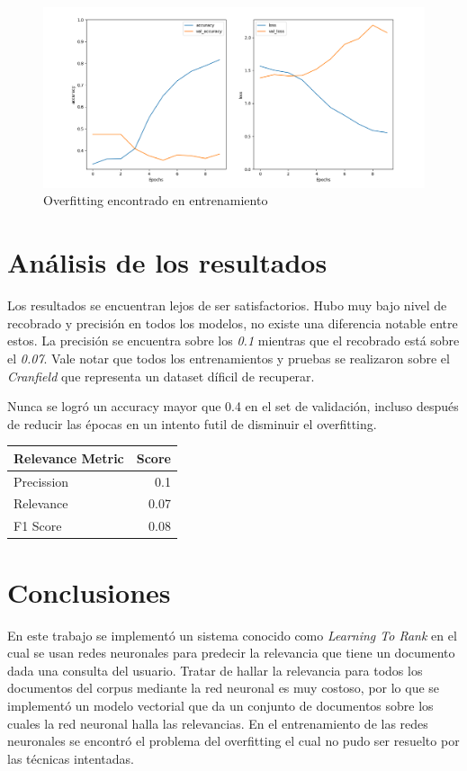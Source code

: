 \documentclass[12pt]{article}
\begin{document}
\begin{figure}
	\centering
	\includegraphics[width=0.7\linewidth]{img/overf}
	\caption{Overfitting encontrado en entrenamiento}
	\label{fig:overf}
\end{figure}


\section{Análisis de los resultados} 

Los resultados se encuentran lejos de ser satisfactorios. Hubo muy bajo nivel de recobrado y precisi\'on en todos los modelos, no existe una diferencia notable entre estos. La precisi\'on se encuentra sobre los \textit{0.1} mientras que el recobrado est\'a sobre el \textit{0.07}. Vale notar que todos los entrenamientos y pruebas se realizaron sobre el \textit{Cranfield} que representa un dataset d\'ificil de recuperar.


Nunca se logr\'o un accuracy mayor que 0.4 en el set de validaci\'on, incluso despu\'es de reducir las \'epocas en un intento futil de disminuir el overfitting.\\

\begin{tabular}{||l|r||} \hline
    Relevance Metric & Score\\
    \hline\hline
    Precission & 0.1\\
    \hline
    Relevance & 0.07\\
    \hline
    F1 Score & 0.08\\
    \hline
\end{tabular}

\section{Conclusiones} %

En este trabajo se implement\'o un sistema conocido como \textit{Learning To Rank} en el cual se usan redes neuronales para predecir la relevancia que tiene un documento dada una consulta del usuario. Tratar de hallar la relevancia para todos los documentos del corpus mediante la red neuronal es muy costoso, por lo que se implement\'o un modelo vectorial que da un conjunto de documentos sobre los cuales la red neuronal halla las relevancias. En el entrenamiento de las redes neuronales se encontr\'o el problema del overfitting el cual no pudo ser resuelto por las t\'ecnicas intentadas.
\end{document}
